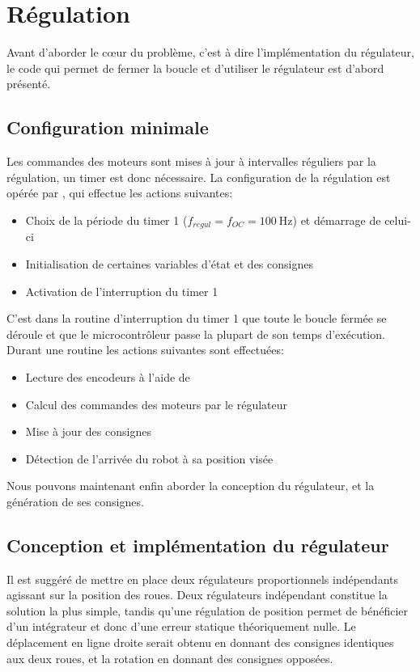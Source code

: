\section{Régulation}
Avant d'aborder le c\oe{}ur du problème, c'est à dire l'implémentation du régulateur, le code qui permet de fermer la boucle et d'utiliser le régulateur est d'abord présenté.
\subsection{Configuration minimale}
Les commandes des moteurs sont mises à jour à intervalles réguliers par la régulation, un timer est donc nécessaire. La configuration de la régulation est opérée par , qui effectue les actions suivantes:
\begin{itemize}
  \item Choix de la période du timer 1 ($f_{regul} = f_{OC} = \SI{100}{\hertz}$) et démarrage de celui-ci
  \item Initialisation de certaines variables d'état et des consignes
  \item Activation de l'interruption du timer 1
\end{itemize}

C'est dans la routine d'interruption du timer 1 que toute le boucle fermée se déroule et que le microcontrôleur passe la plupart de son temps d'exécution. Durant une routine les actions suivantes sont effectuées:
\begin{itemize}
  \item Lecture des encodeurs à l'aide de 
  \item Calcul des commandes des moteurs par le régulateur
  \item Mise à jour des consignes
  \item Détection de l'arrivée du robot à sa position visée
\end{itemize}

Nous pouvons maintenant enfin aborder la conception du régulateur, et la génération de ses consignes.

\subsection{Conception et implémentation du régulateur}
Il est suggéré de mettre en place deux régulateurs proportionnels indépendants agissant sur la position des roues. Deux régulateurs indépendant constitue la solution la plus simple, tandis qu'une régulation de position permet de bénéficier d'un intégrateur et donc d'une erreur statique théoriquement nulle. Le déplacement en ligne droite serait obtenu en donnant des consignes identiques aux deux roues, et la rotation en donnant des consignes opposées.

